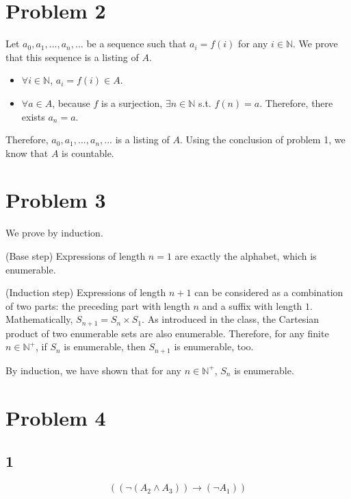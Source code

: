 \documentclass{article}
\begin{document}
\section*{Problem 2}

Let $a_0, a_1,...,a_n, ...$ be a sequence such that $a_i = f(i)$ for any $i\in \mathbb{N}$. We prove that this sequence is a listing of $A$.

\begin{itemize}
	\item
	$\forall i \in \mathbb{N}$, $a_i=f(i)\in A$.
	\item
	$\forall a \in A$, because $f$ is a surjection, $\exists n \in \mathbb{N}$ s.t. $f(n)=a$. Therefore, there exists $a_n=a$.
\end{itemize}

Therefore, $a_0, a_1, ..., a_n, ...$ is a listing of $A$. Using the conclusion of problem 1, we know that $A$ is countable.



\section*{Problem 3}

We prove by induction.

(Base step) Expressions of length $n=1$ are exactly the alphabet, which is enumerable.

(Induction step) Expressions of length $n+1$ can be considered as a combination of two parts: the preceding part with length $n$ and a suffix with length $1$. Mathematically, $S_{n+1}=S_n \times S_1$. As introduced in the class, the Cartesian product of two enumerable sets are also enumerable. Therefore, for any finite $n \in \mathbb{N}^{+}$, if $S_{n}$ is enumerable, then $S_{n+1}$ is enumerable, too.

By induction, we have shown that for any $n\in\mathbb{N}^{+}$, $S_n$ is enumerable.



\section*{Problem 4}

\subsection*{1}

\begin{equation}
\left( \left( \neg \left( A_2 \land A_3 \right) \right) \to \left( \neg A_1 \right) \right)
\end{equation}
\end{document}
